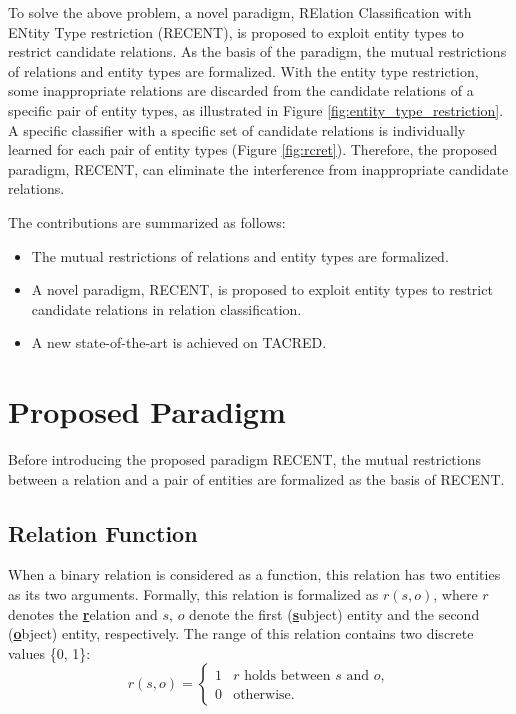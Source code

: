 \documentclass[11pt,a4paper]{article}
\begin{document}
To solve the above problem, a novel paradigm, RElation Classification with ENtity Type restriction (RECENT), 
is proposed to exploit entity types to restrict candidate relations.
As the basis of the paradigm, the mutual restrictions of relations and entity types are formalized. 
With the entity type restriction, some inappropriate relations are discarded from the candidate relations of a specific pair of entity types, as illustrated in Figure  \ref{fig:entity_type_restriction}. 
A specific classifier with a specific set of candidate relations is individually learned for each pair of entity types (Figure \ref{fig:rcret}).
Therefore, the proposed paradigm, RECENT, can eliminate the interference from inappropriate candidate relations. 

The contributions are summarized as follows:
\begin{itemize}
	\setlength{\itemsep}{0pt}
\item The  mutual restrictions of relations and entity types are formalized.
	\item A novel paradigm, RECENT, is proposed to exploit entity types to restrict candidate relations in relation classification.
	\item A new state-of-the-art  is achieved on TACRED.
\end{itemize}








\section{Proposed Paradigm}
Before introducing the proposed paradigm RECENT, 
the mutual restrictions between a relation and a pair of entities are formalized as the basis of RECENT.

\subsection{Relation Function}
When a binary relation is considered as a function, 
this relation has two entities as its two arguments.  
Formally, this relation is formalized as $r(s,o)$, 
where $r$ denotes the \textbf{\underline{r}}elation and $s$, $o$ denote the first (\textbf{\underline{s}}ubject) entity and the second (\textbf{\underline{o}}bject) entity, respectively. 
The range of this relation contains two discrete values \{0, 1\}:
\begin{equation}
r(s,o) = 
\begin{cases}
	1 & r \text{ holds between } s \text{ and } o, \\
	0 & \text{otherwise}.
\end{cases}
\label{eq:relation}
\end{equation}
\end{document}
